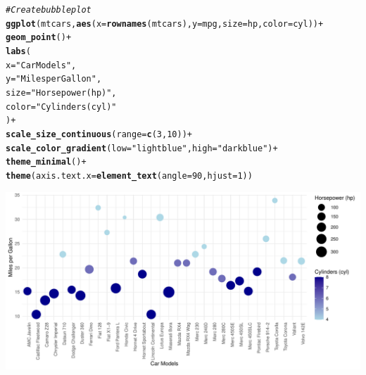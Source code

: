 \documentclass{article}\usepackage[]{graphicx}\usepackage[]{xcolor}
\makeatletter
\def\maxwidth{ %
  \ifdim\Gin@nat@width>\linewidth
    \linewidth
  \else
    \Gin@nat@width
  \fi
}
\newcommand{\hlnum}[1]{\textcolor[rgb]{0.686,0.059,0.569}{#1}}%
\newcommand{\hlstr}[1]{\textcolor[rgb]{0.192,0.494,0.8}{#1}}%
\newcommand{\hlcom}[1]{\textcolor[rgb]{0.678,0.584,0.686}{\textit{#1}}}%
\newcommand{\hlopt}[1]{\textcolor[rgb]{0,0,0}{#1}}%
\newcommand{\hlstd}[1]{\textcolor[rgb]{0.345,0.345,0.345}{#1}}%
\newcommand{\hlkwc}[1]{\textcolor[rgb]{0.333,0.667,0.333}{#1}}%
\newcommand{\hlkwd}[1]{\textcolor[rgb]{0.737,0.353,0.396}{\textbf{#1}}}%
\newenvironment{kframe}{%
 \def\at@end@of@kframe{}%
 \ifinner\ifhmode%
  \def\at@end@of@kframe{\end{minipage}}%
  \begin{minipage}{\columnwidth}%
 \fi\fi%
 \def\FrameCommand##1{\hskip\@totalleftmargin \hskip-\fboxsep
 \colorbox{shadecolor}{##1}\hskip-\fboxsep
     \hskip-\linewidth \hskip-\@totalleftmargin \hskip\columnwidth}%
 \MakeFramed {\advance\hsize-\width
   \@totalleftmargin\z@ \linewidth\hsize
   \@setminipage}}%
 {\par\unskip\endMakeFramed%
 \at@end@of@kframe}
\newenvironment{knitrout}{}{} %
\makeatother
\begin{document}
\begin{knitrout}
\color{fgcolor}\begin{kframe}
\begin{alltt}
\hlcom{#Create bubble plot }
\hlkwd{ggplot}\hlstd{(mtcars,} \hlkwd{aes}\hlstd{(}\hlkwc{x} \hlstd{=} \hlkwd{rownames}\hlstd{(mtcars),} \hlkwc{y} \hlstd{= mpg,} \hlkwc{size} \hlstd{= hp,} \hlkwc{color} \hlstd{= cyl))} \hlopt{+}
  \hlkwd{geom_point}\hlstd{()} \hlopt{+}
  \hlkwd{labs}\hlstd{(}
    \hlkwc{x} \hlstd{=} \hlstr{"Car Models"}\hlstd{,}
    \hlkwc{y} \hlstd{=} \hlstr{"Miles per Gallon"}\hlstd{,}
    \hlkwc{size} \hlstd{=} \hlstr{"Horsepower (hp)"}\hlstd{,}
    \hlkwc{color} \hlstd{=} \hlstr{"Cylinders (cyl)"}
  \hlstd{)} \hlopt{+}
  \hlkwd{scale_size_continuous}\hlstd{(}\hlkwc{range} \hlstd{=} \hlkwd{c}\hlstd{(}\hlnum{3}\hlstd{,} \hlnum{10}\hlstd{))} \hlopt{+}
  \hlkwd{scale_color_gradient}\hlstd{(}\hlkwc{low} \hlstd{=} \hlstr{"lightblue"}\hlstd{,} \hlkwc{high} \hlstd{=} \hlstr{"darkblue"}\hlstd{)} \hlopt{+}
  \hlkwd{theme_minimal}\hlstd{()} \hlopt{+}
  \hlkwd{theme}\hlstd{(}\hlkwc{axis.text.x} \hlstd{=} \hlkwd{element_text}\hlstd{(}\hlkwc{angle} \hlstd{=} \hlnum{90}\hlstd{,} \hlkwc{hjust} \hlstd{=}\hlnum{1}\hlstd{))}
\end{alltt}
\end{kframe}
\includegraphics[width=\maxwidth]{figure/buble-plot-chunk-1} 
\end{knitrout}
\end{document}

